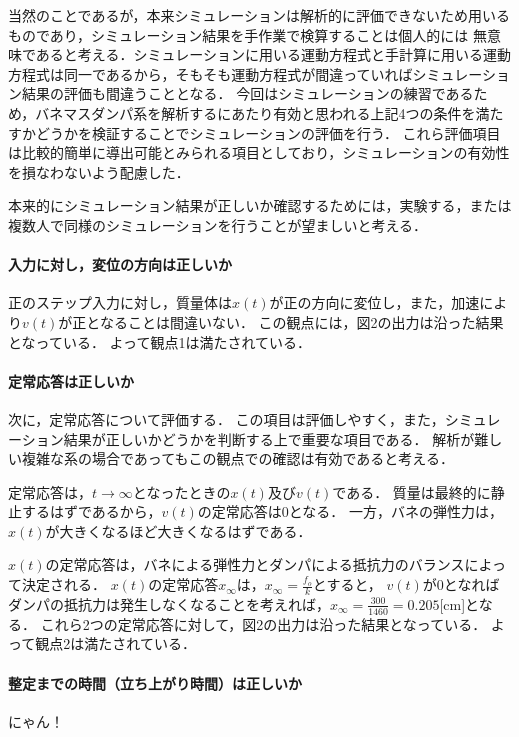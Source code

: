 \documentclass[dvipdfmx,titlepage,a4j]{jsarticle}  %
\begin{document}
当然のことであるが，本来シミュレーションは解析的に評価できないため用いるものであり，シミュレーション結果を手作業で検算することは個人的には
無意味であると考える．シミュレーションに用いる運動方程式と手計算に用いる運動方程式は同一であるから，そもそも運動方程式が間違っていればシミュレーション結果の評価も間違うこととなる．
今回はシミュレーションの練習であるため，バネマスダンパ系を解析するにあたり有効と思われる上記4つの条件を満たすかどうかを検証することでシミュレーションの評価を行う．
これら評価項目は比較的簡単に導出可能とみられる項目としており，シミュレーションの有効性を損なわないよう配慮した．

本来的にシミュレーション結果が正しいか確認するためには，実験する，または複数人で同様のシミュレーションを行うことが望ましいと考える．

\paragraph{入力に対し，変位の方向は正しいか\\}
正のステップ入力に対し，質量体は$x(t)$が正の方向に変位し，また，加速により$v(t)$が正となることは間違いない．
この観点には，図2の出力は沿った結果となっている．
よって観点1は満たされている．

\paragraph{定常応答は正しいか\\}
次に，定常応答について評価する．
この項目は評価しやすく，また，シミュレーション結果が正しいかどうかを判断する上で重要な項目である．
解析が難しい複雑な系の場合であってもこの観点での確認は有効であると考える．

定常応答は，$t \rightarrow \infty$となったときの$x(t)$及び$v(t)$である．
質量は最終的に静止するはずであるから，$v(t)$の定常応答は0となる．
一方，バネの弾性力は，$x(t)$が大きくなるほど大きくなるはずである．

$x(t)$の定常応答は，バネによる弾性力とダンパによる抵抗力のバランスによって決定される．
$x(t)$の定常応答$x_\infty$は，$x_\infty = \frac{f_o}{k}$とすると，
$v(t)$が0となればダンパの抵抗力は発生しなくなることを考えれば，$x_\infty = \frac{300}{1460} = 0.205$[cm]となる．
これら2つの定常応答に対して，図2の出力は沿った結果となっている．
よって観点2は満たされている．

\paragraph{整定までの時間（立ち上がり時間）は正しいか\\}
にゃん！
\end{document}
